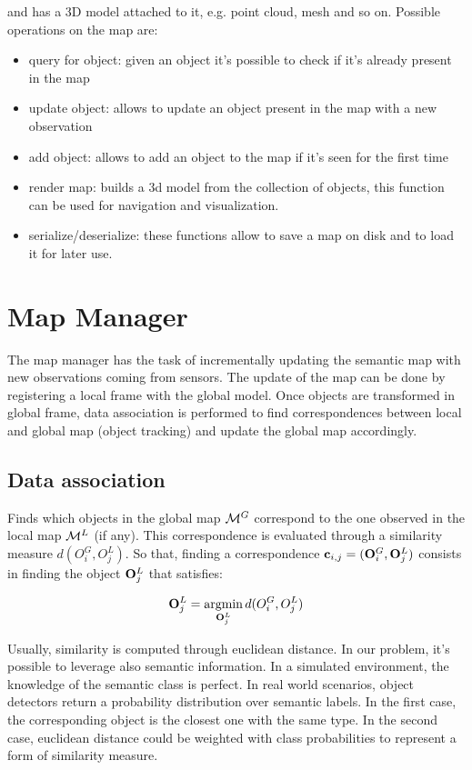 \documentclass{article}
\begin{document}
	\noindent
	and has a 3D model attached to it, e.g. point cloud, mesh and so on. Possible operations on the map are:
	
	\begin{itemize}
		\item query for object: given an object it's possible to check if it's already present in the map
		\item update object: allows to update an object present in the map with a new observation
		\item add object: allows to add an object to the map if it's seen for the first time
		\item render map: builds a 3d model from the collection of objects, this function can be used for navigation and visualization.
		\item serialize/deserialize: these functions allow to save a map on disk and to load it for later use.
	\end{itemize}
	
	\section{Map Manager}
	
	The map manager has the task of incrementally updating the semantic map with new observations coming from sensors. The update of the map can be done by registering a local frame with the global model. Once objects are transformed in global frame, data association is performed to find correspondences between local and global map (object tracking) and update the global map accordingly.
	
	\subsection{Data association} 
	
	Finds which objects in the global map $\mathcal{M}^G$ correspond to the one observed in the local map $\mathcal{M}^L$ (if any). This correspondence is evaluated through a similarity measure $d(O_i^G,O_j^L)$. So that, finding a correspondence $\mathbf{c}_{i,j} = (\mathbf{O}_i^G,\mathbf{O}_j^L)$ consists in finding the object $\mathbf{O}_j^L$ that satisfies:
	
	\begin{equation}
		\mathbf{O}_j^L = \operatorname*{argmin}_{\mathbf{O}_j^L}  d(O_i^G,O_j^L)
	\end{equation}
	
	Usually, similarity is computed through euclidean distance. In our problem, it's possible to leverage also semantic information. In a simulated environment, the knowledge of the semantic class is perfect. In real world scenarios, object detectors return a probability distribution over semantic labels. In the first case, the corresponding object is the closest one with the same type. In the second case, euclidean distance could be weighted with class probabilities to represent a form of similarity measure.
	
\end{document}
